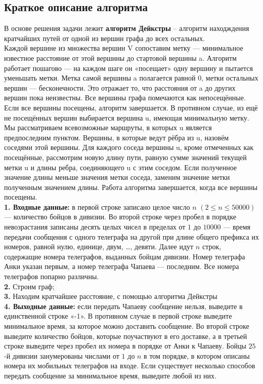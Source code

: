 \documentclass[a5paper, 10pt]{article}
\theoremstyle{definition}
\theoremstyle{plain}
\theoremstyle{remark}
\begin{document}
\subsection{Краткое описание алгоритма}
В основе решения задачи лежит \textbf{алгоритм Дейкстры} -- алгоритм находждения кратчайших путей от одной из вершин графа до всех остальных.\\

Каждой вершине из множества вершин V сопоставим метку — минимальное известное расстояние от этой вершины до стартовой вершины a.
Алгоритм работает пошагово — на каждом шаге он «посещает» одну вершину и пытается уменьшать метки. Метка самой вершины a полагается равной 0, метки остальных вершин — бесконечности. Это отражает то, что расстояния от a до других вершин пока неизвестны. Все вершины графа помечаются как непосещённые.\\

 Если все вершины посещены, алгоритм завершается. В противном случае, из ещё не посещённых вершин выбирается вершина u, имеющая минимальную метку. Мы рассматриваем всевозможные маршруты, в которых u является предпоследним пунктом. Вершины, в которые ведут рёбра из u, назовём соседями этой вершины. Для каждого соседа вершины u, кроме отмеченных как посещённые, рассмотрим новую длину пути, равную сумме значений текущей метки u и длины ребра, соединяющего u с этим соседом. Если полученное значение длины меньше значения метки соседа, заменим значение метки полученным значением длины. Работа алгоритма завершается, когда все вершины посещены. \\


\textbf{1. Входные данные:} в первой строке записано целое число $n$ $(2 \leq n \leq 50000)$ — количество бойцов в дивизии. Во второй строке через пробел в порядке невозрастания записаны десять целых чисел в пределах от $1$ до $10000$ — время передачи сообщения с одного телеграфа на другой при длине общего префикса их номеров, равной нулю, единице, двум, …, девяти. Далее идут $n$ строк, содержащие номера телеграфов, выданных бойцам дивизии. Номер телеграфа Анки указан первым, а номер телеграфа Чапаева — последним. Все номера телеграфов попарно различны.  \\

\textbf{2.}  Строим граф;\\

\textbf{3.} Находим кратчайшее расстояние, с помощью алгоритма Дейкстры \\

\textbf{4. Выходные данные:} если передать Чапаеву сообщение нельзя, выведите в единственной строке «-1». В противном случае в первой строке выведите минимальное время, за которое можно доставить сообщение. Во второй строке выведите количество бойцов, которые поучаствуют в его доставке, а в третьей строке выведите через пробел их номера в порядке от Анки к Чапаеву. Бойцы $25$-й дивизии занумерованы числами от $1$ до $n$ в том порядке, в котором описаны номера их мобильных телеграфов на входе. Если существует несколько способов передать сообщение за минимальное время, выведите любой из них.
\end{document}
